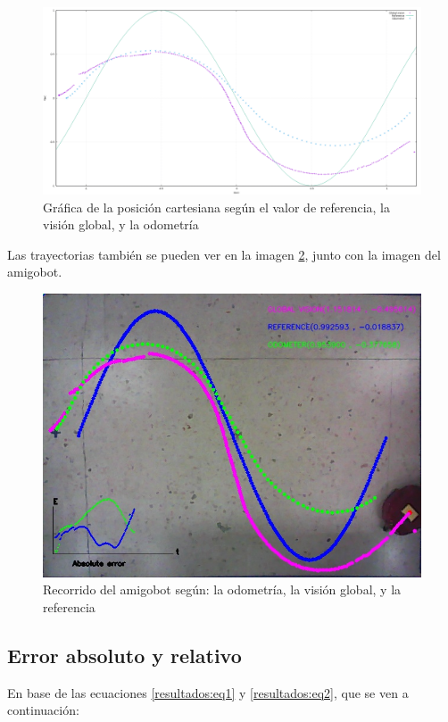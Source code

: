 \documentclass[spanish,10pt,letterpaper, twocolumn]{article}
\begin{document}
\begin{figure}[ht]
	\centering
	\includegraphics[scale=0.15]{graficas.png}
	\caption{Gr\'afica de la posici\'on cartesiana seg\'un el valor de referencia, la visi\'on global, y la odometr\'ia}
	\label{resultados:fig1}
\end{figure}

Las trayectorias tambi\'en se pueden ver en la imagen \ref{resultados:fig2}, junto con la imagen del amigobot.
\begin{figure}[ht]
	\centering
	\includegraphics[scale=0.2]{mejora309.jpg}
	\caption{Recorrido del amigobot seg\'un: la odometr\'ia, la visi\'on global, y la referencia}
	\label{resultados:fig2}
\end{figure}

\subsection{Error absoluto y relativo}
En base de las ecuaciones \eqref{resultados:eq1} y \eqref{resultados:eq2}, que se ven a continuaci\'on:
\end{document}
